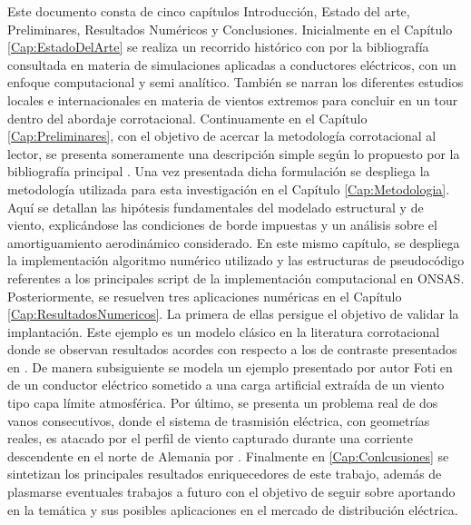  Este documento consta de cinco capítulos Introducción, Estado del arte, Preliminares, Resultados Numéricos y Conclusiones. Inicialmente en el Capítulo \ref{Cap:EstadoDelArte} se realiza un recorrido histórico con por la bibliografía consultada en materia de simulaciones aplicadas a conductores eléctricos, con un enfoque computacional y semi analítico. También se narran los diferentes estudios locales e internacionales en materia de vientos extremos para concluir en un tour dentro del abordaje corrotacional. Continuamente en el Capítulo \ref{Cap:Preliminares}, con el objetivo de acercar la metodología corrotacional al lector, se presenta someramente una descripción simple según lo propuesto por la bibliografía principal \citet{Le2014}. Una vez presentada dicha formulación se despliega la metodología utilizada para esta investigación en el Capítulo \ref{Cap:Metodologia}. Aquí se detallan las hipótesis fundamentales del modelado estructural y de viento, explicándose las condiciones de borde impuestas y un análisis sobre el amortiguamiento aerodinámico considerado. En este mismo capítulo, se despliega la implementación algoritmo numérico utilizado y las estructuras de pseudocódigo referentes a los principales script de la implementación computacional en ONSAS. Posteriormente, se resuelven tres aplicaciones numéricas en el Capítulo \ref{Cap:ResultadosNumericos}. La primera de ellas persigue el objetivo de validar la implantación. Este ejemplo es un modelo clásico en la literatura corrotacional donde se observan resultados acordes con respecto a los de contraste presentados en \cite{Le2014}. De manera subsiguiente se modela un ejemplo presentado por autor Foti en \cite{Foti2016} de un conductor eléctrico sometido a una carga artificial extraída de un viento tipo capa límite atmosférica. Por último, se presenta un problema real de dos vanos consecutivos, donde el sistema de trasmisión eléctrica, con geometrías reales, es atacado por el perfil de viento capturado durante una corriente descendente en el norte de Alemania por \cite{Stengel2017a}. Finalmente en  \ref{Cap:Conlcusiones} se sintetizan los principales resultados enriquecedores de este trabajo, además de plasmarse eventuales trabajos a futuro con el objetivo de seguir sobre aportando en la temática y sus posibles aplicaciones en el mercado de distribución eléctrica.